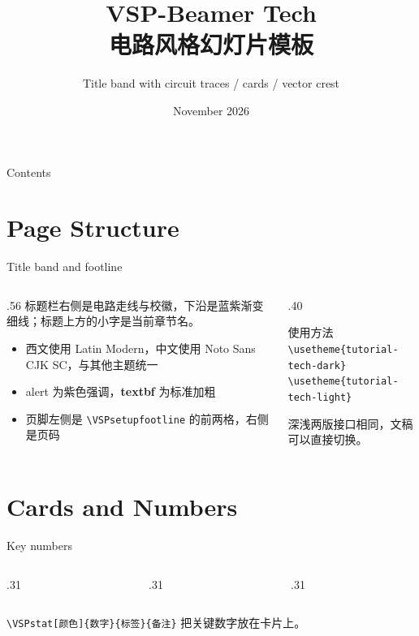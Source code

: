 \documentclass[aspectratio=169,10pt]{beamer}
\title[VSP-Beamer Tech]{VSP-Beamer Tech\\电路风格幻灯片模板}
\subtitle{Title band with circuit traces / cards / vector crest}
\date{November 2026}
\begin{document}
\VSPtitleframe

\begin{frame}{Contents}
  \tableofcontents
\end{frame}

\section{Page Structure}

\begin{frame}[t]{Title band and footline}
\begin{columns}[T,onlytextwidth]
  \begin{column}{.56\textwidth}
    标题栏右侧是电路走线与校徽，下沿是蓝紫渐变细线；标题上方的小字是当前章节名。
    \begin{itemize}
      \item 西文使用 Latin Modern，中文使用 Noto Sans CJK SC，与其他主题统一
      \item \alert{alert} 为紫色强调，\textbf{textbf} 为标准加粗
      \item 页脚左侧是 \texttt{\textbackslash VSPsetupfootline} 的前两格，右侧是页码
    \end{itemize}
  \end{column}
  \begin{column}{.40\textwidth}
    \begin{vspquote}{使用方法}
      \texttt{\textbackslash usetheme\{tutorial-tech-dark\}}\\
      \texttt{\textbackslash usetheme\{tutorial-tech-light\}}

      深浅两版接口相同，文稿可以直接切换。
    \end{vspquote}
  \end{column}
\end{columns}
\end{frame}

\section{Cards and Numbers}

\begin{frame}[t]{Key numbers}
\begin{columns}[T,onlytextwidth]
  \begin{column}{.31\textwidth}\end{column}
  \begin{column}{.31\textwidth}\end{column}
  \begin{column}{.31\textwidth}\end{column}
\end{columns}

\vspace{6pt}
\texttt{\textbackslash VSPstat[颜色]\{数字\}\{标签\}\{备注\}} 把关键数字放在卡片上。
\end{frame}
\end{document}
